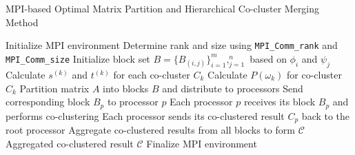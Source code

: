 \documentclass[journal]{IEEEtran}
\begin{document}

\begin{algorithm}[!t]
  \caption{MPI-based Optimal Matrix Partition and Hierarchical Co-cluster Merging Method}\label{alg:mpi_method}
  \begin{algorithmic}[1]
    \STATE Initialize MPI environment
    \STATE Determine rank and size using \texttt{MPI\_Comm\_rank} and \texttt{MPI\_Comm\_size}
      \STATE Initialize block set $B = \{B_{(i,j)}\}_{i=1}^m,_{j=1}^n$ based on $\phi_i$ and $\psi_j$
      \STATE Calculate $s^{(k)}$ and $t^{(k)}$ for each co-cluster $C_k$
        \STATE Calculate $P(\omega_k)$ for co-cluster $C_k$
          \STATE Partition matrix $A$ into blocks $B$ and distribute to processors
            \STATE Send corresponding block $B_p$ to processor $p$
          \ENDFOR
        \ENDIF
      \ENDFOR
    \ENDIF
    \STATE Each processor $p$ receives its block $B_p$ and performs co-clustering
    \STATE Each processor sends its co-clustered result $C_p$ back to the root processor
      \STATE Aggregate co-clustered results from all blocks to form $\mathcal{C}$
      \RETURN Aggregated co-clustered result $\mathcal{C}$
    \ENDIF
    \STATE Finalize MPI environment
  \end{algorithmic}
\end{algorithm}
\end{document}
